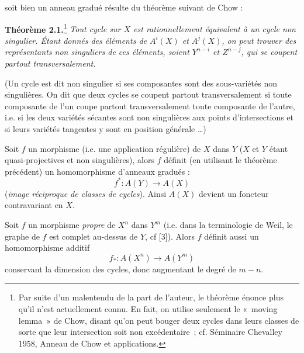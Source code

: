 soit bien un anneau gradué résulte du théorème suivant de Chow :

\textbf{Théorème 2.1.}\footnote{Par suite d'un malentendu de la part de l'auteur, le théorème énonce plus qu'il n'est actuellement connu. En fait, on utilise seulement le «~moving lemma~» de Chow, disant qu'on peut bouger deux cycles dans leurs classes de sorte que leur intersection soit non excédentaire~; cf. Séminaire Chevalley 1958, Anneau de Chow et applications.} \emph{Tout cycle sur $X$ est rationnellement équivalent à un cycle non singulier. Étant donnés des éléments de $A^i(X)$ et $A^j(X)$, on peut trouver des représentants non singuliers de ces éléments, soient $Y^{n-i}$ et $Z^{n-j}$, qui se coupent partout transversalement.}

(Un cycle est dit non singulier si ses composantes sont des sous-variétés non singulières. On dit que deux cycles se coupent partout transversalement si toute composante de l'un coupe partout transversalement toute composante de l'autre, i.e. si les deux variétés sécantes sont non singulières aux points d'intersections et si leurs variétés tangentes y sont en position générale \dots)

Soit $f$ un morphisme (i.e. une application régulière) de $X$ dans $Y$ ($X$ et $Y$ étant quasi-projectives et non singulières), alors $f$ définit (en utilisant le théorème précédent) un homomorphisme d'anneaux gradués :
\begin{equation}\tag{2.1}
f^*:A(Y)\longrightarrow A(X)
\end{equation}
(\emph{image réciproque de classes de cycles}). Ainsi $A(X)$ devient un foncteur contravariant en $X$.

Soit $f$ un morphisme \emph{propre} de $X^n$ dans $Y^m$ (i.e. dans la terminologie de Weil, le graphe de $f$ est complet au-dessus de $Y$, cf [3]). Alors $f$ définit aussi un homomorphisme additif
\begin{equation}\tag{2.2}
f_*:A(X^n)\longrightarrow A(Y^m)
\end{equation}
conservant la dimension des cycles, donc augmentant le degré de $m-n$.




